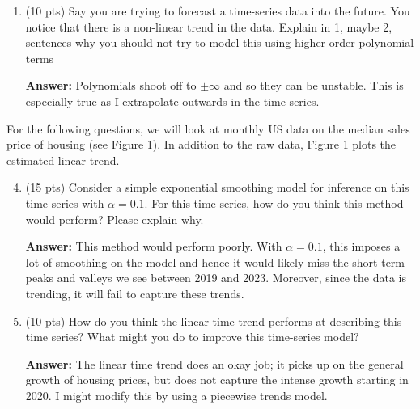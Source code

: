 \documentclass[12pt]{article}
\newcommand{\answer}[1]{{\color{blue_winged_teal}\textbf{Answer:} #1}}
\newcommand{\pts}[1]{{\color{zinc500}(#1 pts)}}
\begin{document}
\begin{enumerate}
\begin{enumerate}
    \answer{
      A two-sided moving average uses observations in the future and in the past to form the forecast. At the ends of our time-series we do not have enough observations in the past or in the future, so we can not form the average.
    }
    
    \item Your boss replies that they really want to predict into next month. How would you adjust your choice of smoothing method to do this?
    
    \answer{
      Instead, I would use either a one-sided moving average or a simple exponential smoothing to form my forecast. 
      Since these only use past observations, I can forecast into the future period. 
    }
  \end{enumerate}

  \item \pts{10} Say you are trying to forecast a time-series data into the future. You notice that there is a non-linear trend in the data. Explain in 1, maybe 2, sentences why you should not try to model this using higher-order polynomial terms
  
  \answer{
    Polynomials shoot off to $\pm \infty$ and so they can be unstable. This is especially true as I extrapolate outwards in the time-series.
  }
\end{enumerate}

\bigskip\bigskip
\noindent For the following questions, we will look at monthly US data on the median sales price of housing (see Figure 1). In addition to the raw data, Figure 1 plots the estimated linear trend.

\begin{enumerate}
  \setcounter{enumi}{3}
  \item \pts{15} Consider a simple exponential smoothing model for inference on this time-series with $\alpha = 0.1$. For this time-series, how do you think this method would perform? Please explain why.
  
  \answer{
    This method would perform poorly. 
    With $\alpha = 0.1$, this imposes a lot of smoothing on the model and hence it would likely miss the short-term peaks and valleys we see between 2019 and 2023. 
    Moreover, since the data is trending, it will fail to capture these trends.
  }
  
  \item \pts{10} How do you think the linear time trend performs at describing this time series? What might you do to improve this time-series model?
  
  \answer{
    The linear time trend does an okay job; it picks up on the general growth of housing prices, but does not capture the intense growth starting in 2020.
    I might modify this by using a piecewise trends model.
  }
\end{enumerate}
\end{document}
